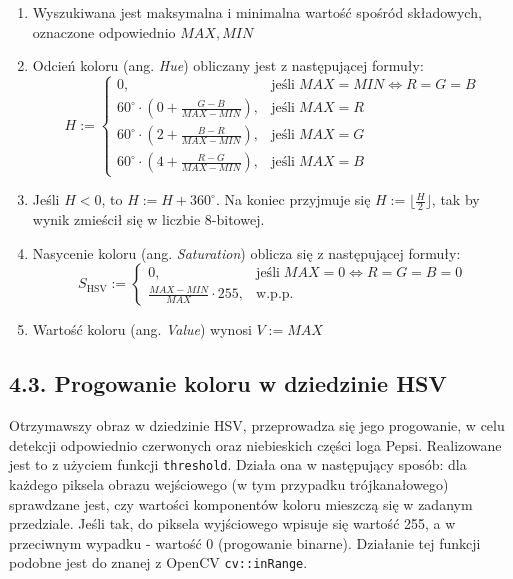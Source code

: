 \documentclass[11pt,a4paper,twoside]{report}
\begin{document}
			\begin{enumerate}
				\item Wyszukiwana jest maksymalna i minimalna wartość spośród składowych, oznaczone odpowiednio $MAX, MIN$
				\item Odcień koloru (ang. \emph{Hue}) obliczany jest z następującej formuły:
					\[
						H := \begin{cases}
						    0, & \text{jeśli}\; MAX = MIN \Leftrightarrow R = G = B \\
						    60^\circ \cdot \left( 0 + \frac {G - B} {MAX - MIN} \right), & \text{jeśli}\; MAX = R \\
						    60^\circ \cdot \left( 2 + \frac {B - R} {MAX - MIN} \right), & \text{jeśli}\; MAX = G \\
						    60^\circ \cdot \left( 4 + \frac {R - G} {MAX - MIN} \right), & \text{jeśli}\; MAX = B
						   \end{cases}
					\]
				\item Jeśli $H < 0$, to $H := H + 360^\circ$. Na koniec przyjmuje się $H := \lfloor \frac{H}{2} \rfloor$, tak by wynik zmieścił się w liczbie 8-bitowej.
				\item Nasycenie koloru (ang. \emph{Saturation}) oblicza się z następującej formuły:
					\[
						S_{\mathrm {HSV} }:={\begin{cases}0,&{\text{jeśli}}\;MAX=0\Leftrightarrow R=G=B=0\\{\frac {MAX-MIN}{MAX} \cdot 255},&{\text{w.p.p.}}\end{cases}}
					\]
				\item Wartość koloru (ang. \emph{Value}) wynosi $V := MAX$
			\end{enumerate}

	\subsection*{4.3. Progowanie koloru w dziedzinie HSV}

			Otrzymawszy obraz w dziedzinie HSV, przeprowadza się jego progowanie, w celu detekcji odpowiednio czerwonych oraz niebieskich części loga Pepsi. Realizowane jest to z użyciem funkcji \texttt{threshold}. Działa ona w następujący sposób: dla każdego piksela obrazu wejściowego (w tym przypadku trójkanałowego) sprawdzane jest, czy wartości komponentów koloru mieszczą się w zadanym przedziale. Jeśli tak, do piksela wyjściowego wpisuje się wartość 255, a w przeciwnym wypadku - wartość 0 (progowanie binarne). Działanie tej funkcji podobne jest do znanej z OpenCV \texttt{cv::inRange}.
\end{document}

